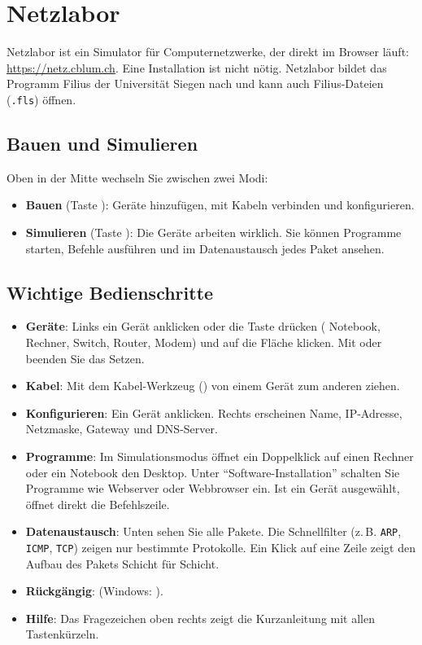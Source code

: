 \chapter{Netzlabor}
\label{subsec:netzlabor}
Netzlabor ist ein Simulator für Computernetzwerke, der direkt im Browser läuft: \url{https://netz.cblum.ch}. Eine Installation ist nicht nötig. Netzlabor bildet das Programm Filius der Universität Siegen nach und kann auch Filius-Dateien (\texttt{.fls}) öffnen.

\section{Bauen und Simulieren}
Oben in der Mitte wechseln Sie zwischen zwei Modi:
\begin{itemize}
	\item \textbf{Bauen} (Taste ): Geräte hinzufügen, mit Kabeln verbinden und konfigurieren.
	\item \textbf{Simulieren} (Taste ): Die Geräte arbeiten wirklich. Sie können Programme starten, Befehle ausführen und im Datenaustausch jedes Paket ansehen.
\end{itemize}

\section{Wichtige Bedienschritte}
\begin{itemize}
	\item \textbf{Geräte}: Links ein Gerät anklicken oder die Taste drücken ( Notebook,  Rechner,  Switch,  Router,  Modem) und auf die Fläche klicken. Mit  oder  beenden Sie das Setzen.
	\item \textbf{Kabel}: Mit dem Kabel-Werkzeug () von einem Gerät zum anderen ziehen.
	\item \textbf{Konfigurieren}: Ein Gerät anklicken. Rechts erscheinen Name, \gls{IP}-Adresse, Netzmaske, Gateway und \gls{DNS}-Server.
	\item \textbf{Programme}: Im Simulationsmodus öffnet ein Doppelklick auf einen Rechner oder ein Notebook den Desktop. Unter \enquote{Software-Installation} schalten Sie Programme wie Webserver oder Webbrowser ein. Ist ein Gerät ausgewählt, öffnet  direkt die Befehlszeile.
	\item \textbf{Datenaustausch}: Unten sehen Sie alle Pakete. Die Schnellfilter (z.\,B. \texttt{ARP}, \texttt{ICMP}, \texttt{TCP}) zeigen nur bestimmte Protokolle. Ein Klick auf eine Zeile zeigt den Aufbau des Pakets Schicht für Schicht.
	\item \textbf{Rückgängig}:  (Windows: ).
	\item \textbf{Hilfe}: Das Fragezeichen oben rechts zeigt die Kurzanleitung mit allen Tastenkürzeln.
\end{itemize}

